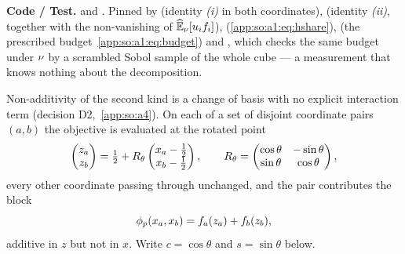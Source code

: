 \begin{sloppypar}
\textbf{Code / Test.}  and .
Pinned by  (identity \emph{(i)} in both
coordinates),  (identity
\emph{(ii)}, together with the non-vanishing of $\operatorname{\widehat{\mathbb{E}}}_\nu[u_i f_i]$),
(\eqref{app:so:a1:eq:hshare}),  (the
prescribed budget~\eqref{app:so:a1:eq:budget}) and
, which checks the same budget under
$\nu$ by a scrambled Sobol sample of the whole cube --- a measurement that
knows nothing about the decomposition.
\end{sloppypar}

\label{app:so:a1:rotation}

Non-additivity of the second kind is a change of basis with no explicit
interaction term (decision D2,~\ref{app:so:a4}). On each of a set of disjoint
coordinate pairs $(a,b)$ the objective is evaluated at the rotated point
\begin{equation}\label{app:so:a1:eq:rotmap}
  \begin{pmatrix}z_a\\z_b\end{pmatrix}
  =\tfrac12+R_\theta\begin{pmatrix}x_a-\tfrac12\\x_b-\tfrac12\end{pmatrix},
  \qquad
  R_\theta=\begin{pmatrix}\cos\theta&-\sin\theta\\\sin\theta&\cos\theta\end{pmatrix},
\end{equation}
every other coordinate passing through unchanged, and the pair contributes the
block
\begin{equation}\label{app:so:a1:eq:block}
  \phi_p(x_a,x_b)=f_a(z_a)+f_b(z_b),
\end{equation}
additive in $z$ but not in $x$. Write $c=\cos\theta$ and $s=\sin\theta$ below.

